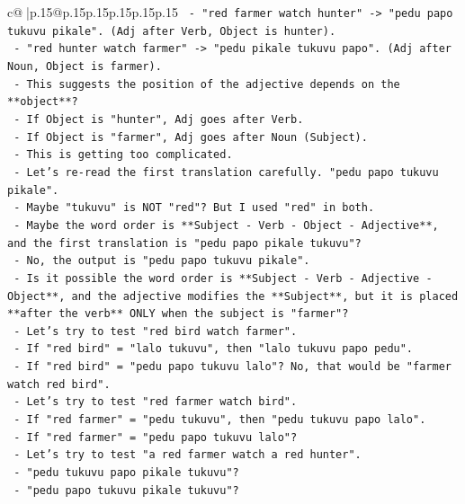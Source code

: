 \documentclass{article}
\begin{document}
{\begin{supertabular}{c@{$\;$}|p{.15\linewidth}@{}p{.15\linewidth}p{.15\linewidth}p{.15\linewidth}p{.15\linewidth}p{.15\linewidth}}
{{{\texttt{         {-} "red farmer watch hunter" {-}> "pedu papo tukuvu pikale". (Adj after Verb, Object is hunter).} \\
\texttt{         {-} "red hunter watch farmer" {-}> "pedu pikale tukuvu papo". (Adj after Noun, Object is farmer).} \\
\texttt{         {-} This suggests the position of the adjective depends on the **object**?} \\
\texttt{         {-} If Object is "hunter", Adj goes after Verb.} \\
\texttt{         {-} If Object is "farmer", Adj goes after Noun (Subject).} \\
\texttt{         {-} This is getting too complicated.} \\
\texttt{       {-} Let's re{-}read the first translation carefully. "pedu papo tukuvu pikale".} \\
\texttt{       {-} Maybe "tukuvu" is NOT "red"? But I used "red" in both.} \\
\texttt{       {-} Maybe the word order is **Subject {-} Verb {-} Object {-} Adjective**, and the first translation is "pedu papo pikale tukuvu"?} \\
\texttt{         {-} No, the output is "pedu papo tukuvu pikale".} \\
\texttt{       {-} Is it possible the word order is **Subject {-} Verb {-} Adjective {-} Object**, and the adjective modifies the **Subject**, but it is placed **after the verb** ONLY when the subject is "farmer"?} \\
\texttt{       {-} Let's try to test "red bird watch farmer".} \\
\texttt{         {-} If "red bird" = "lalo tukuvu", then "lalo tukuvu papo pedu".} \\
\texttt{         {-} If "red bird" = "pedu papo tukuvu lalo"? No, that would be "farmer watch red bird".} \\
\texttt{       {-} Let's try to test "red farmer watch bird".} \\
\texttt{         {-} If "red farmer" = "pedu tukuvu", then "pedu tukuvu papo lalo".} \\
\texttt{         {-} If "red farmer" = "pedu papo tukuvu lalo"?} \\
\texttt{       {-} Let's try to test "a red farmer watch a red hunter".} \\
\texttt{         {-} "pedu tukuvu papo pikale tukuvu"?} \\
\texttt{         {-} "pedu papo tukuvu pikale tukuvu"?} \\
}}}
\end{supertabular}}
\end{document}
